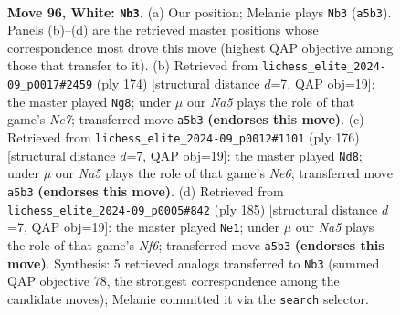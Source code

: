 \documentclass[11pt]{article}
\begin{document}
\clearpage

\begin{figure}[p]\centering
\begin{subfigure}{0.46\textwidth}\centering
\resizebox{\linewidth}{!}{%
\newchessgame
\chessboard[
  setfen={8/4R3/1k6/N4K2/8/8/6P1/3r4 w - - 56 96},
  showmover=false,
  pgfstyle=straightmove, color=movearrow, markmove={a5-b3}
]}
\caption{}
\end{subfigure}\hfill
\begin{subfigure}{0.46\textwidth}\centering
\resizebox{\linewidth}{!}{%
\newchessgame
\chessboard[
  setfen={8/4N2K/4k3/8/8/8/3r4/8 w - - 24 88},
  showmover=false,
  pgfstyle=straightmove, color=movearrow, markmove={e7-g8}
]}
\caption{}
\end{subfigure}
\\[4pt]
\begin{subfigure}{0.46\textwidth}\centering
\resizebox{\linewidth}{!}{%
\newchessgame
\chessboard[
  setfen={8/8/4Nk2/8/8/8/3K4/r7 w - - 55 89},
  showmover=false,
  pgfstyle=straightmove, color=movearrow, markmove={e6-d8}
]}
\caption{}
\end{subfigure}\hfill
\begin{subfigure}{0.46\textwidth}\centering
\resizebox{\linewidth}{!}{%
\newchessgame
\chessboard[
  setfen={8/8/8/R7/8/4Kn2/1k6/8 b - - 35 93},
  showmover=false,
  pgfstyle=straightmove, color=movearrow, markmove={f3-e1}
]}
\caption{}
\end{subfigure}
\caption{\textbf{Move 96, White: \texttt{Nb3}.} (a) Our position; Melanie plays \texttt{Nb3} (\texttt{a5b3}). Panels (b)--(d) are the retrieved master positions whose correspondence most drove this move (highest QAP objective among those that transfer to it). (b) Retrieved from \texttt{lichess\_elite\_2024-09\_p0017\#2459} (ply 174) [structural distance $d$=7, QAP obj=19]: the master played \texttt{Ng8}; under $\mu$ our \emph{Na5} plays the role of that game's \emph{Ne7}; transferred move \texttt{a5b3} \textbf{(endorses this move)}. (c) Retrieved from \texttt{lichess\_elite\_2024-09\_p0012\#1101} (ply 176) [structural distance $d$=7, QAP obj=19]: the master played \texttt{Nd8}; under $\mu$ our \emph{Na5} plays the role of that game's \emph{Ne6}; transferred move \texttt{a5b3} \textbf{(endorses this move)}. (d) Retrieved from \texttt{lichess\_elite\_2024-09\_p0005\#842} (ply 185) [structural distance $d$=7, QAP obj=19]: the master played \texttt{Ne1}; under $\mu$ our \emph{Na5} plays the role of that game's \emph{Nf6}; transferred move \texttt{a5b3} \textbf{(endorses this move)}. Synthesis: 5 retrieved analogs transferred to \texttt{Nb3} (summed QAP objective 78, the strongest correspondence among the candidate moves); Melanie committed it via the \texttt{search} selector.}
\label{fig:thought-m190}
\end{figure}
\end{document}
